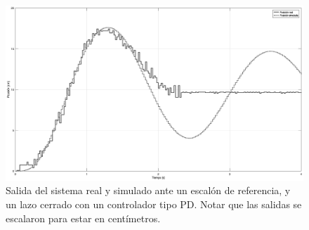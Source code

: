 \begin{figure}[!tbp]
    \centering
    \includegraphics[width=\linewidth]{img/pd-ref-salida.eps}
    \caption{Salida del sistema real y simulado ante un escalón de referencia, y un lazo cerrado con un controlador tipo PD. Notar que las salidas se escalaron para estar en centímetros.}
    \label{fig:pd-ref-salida}
\end{figure}

